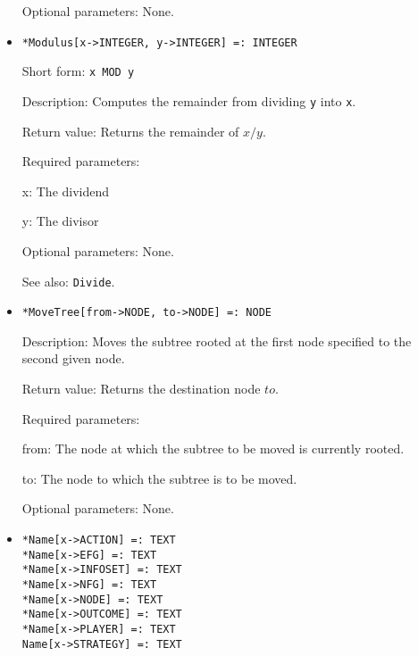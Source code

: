 \begin{itemize}
\item
[Optional parameters:] None.
\ed

\item
\protect \large \begin{verbatim}
*Modulus[x->INTEGER, y->INTEGER] =: INTEGER
\end{verbatim}\normalsize

\bd
\item
[Short form:] \verb+x MOD y+
\item
[Description:] Computes the remainder from dividing \verb+y+ into \verb+x+.
\item
[Return value:] Returns the remainder of $x / y$.
\item
[Required parameters:]\hfil\null

\bd
\item
[x:] The dividend
\item
[y:] The divisor
\ed

\item
[Optional parameters:] None.
\item
[See also:] \verb+Divide+.
\ed


\item
\protect \large \begin{verbatim}
*MoveTree[from->NODE, to->NODE] =: NODE
\end{verbatim}\normalsize

\bd
\item
[Description:] Moves the subtree rooted at the first node specified to
the second given node.
\item
[Return value:] Returns the destination node $to$.
\item
[Required parameters:]\hfil\null
	  
\bd
\item
[from:] The node at which the subtree to be moved is currently rooted.
\item
[to:] The node to which the subtree is to be moved.
\ed

\item
[Optional parameters:] None.
\ed


\item
\protect \large \begin{verbatim}
*Name[x->ACTION] =: TEXT
*Name[x->EFG] =: TEXT
*Name[x->INFOSET] =: TEXT
*Name[x->NFG] =: TEXT
*Name[x->NODE] =: TEXT
*Name[x->OUTCOME] =: TEXT
*Name[x->PLAYER] =: TEXT
Name[x->STRATEGY] =: TEXT
\end{verbatim}\normalsize


\end{itemize}
